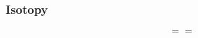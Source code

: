 
%         





%         
%         


%             
%             

\begin{frame}
    \frametitle{Isotopy}

    \begin{gather*}
        
        \quad = 
        = \quad 
    \end{gather*}
\end{frame}


